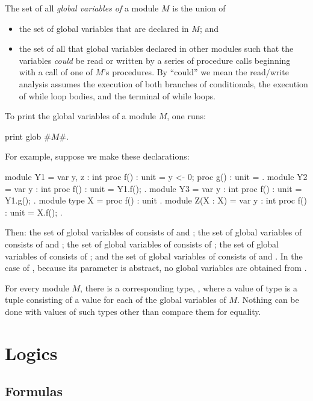 The set of all \emph{global variables of} a module $M$ is the
union of
\begin{itemize}
\item the set of global variables that are declared in $M$; and

\item the set of all that global variables declared in other modules
  such that the variables \emph{could} be read or written by a series
  of procedure calls beginning with a call of one of $M$'s
  procedures. By ``could'' we mean the read/write analysis assumes the
  execution of both branches of conditionals, the execution of while
  loop bodies, and the terminal of while loops.
\end{itemize}
To print the global variables of a module $M$, one runs:
\begin{easycrypt}{}{}
print glob #$M$#.
\end{easycrypt}

For example, suppose we make these declarations:
\begin{easycrypt}{}{}
module Y1 = {
  var y, z : int
  proc f() : unit = { y <- 0; }
  proc g() : unit = { }
}.
module Y2 = {
  var y : int
  proc f() : unit = { Y1.f(); }
}.
module Y3 = {
  var y : int
  proc f() : unit = { Y1.g(); }
}.
module type X = {
  proc f() : unit
}.
module Z(X : X) = {
  var y : int
  proc f() : unit = { X.f(); }
}.
\end{easycrypt}
Then: the set of global variables of  consists of  and
; the set of global variables of  consists of
 and ; the set of global variables of 
consists of ; the set of global variables of  consists
of ; and the set of global variables of  consists of
 and . In the case of , because its parameter
 is abstract, no global variables are obtained from .

For every module $M$, there is a corresponding type, ,
where a value of type  is a tuple consisting of
a value for each of the global variables of $M$. Nothing can be done with
values of such types other than compare them for equality.

\section{Logics}

\subsection{Formulas}

